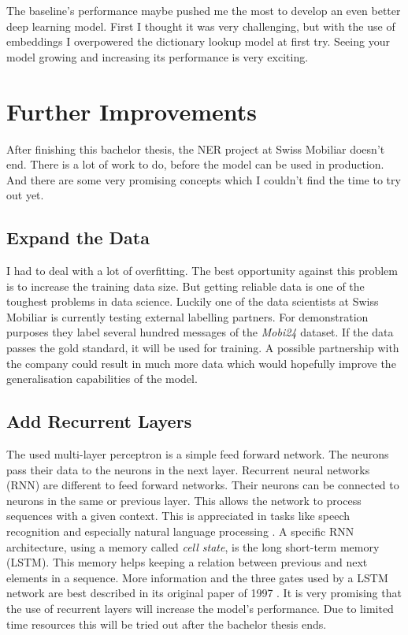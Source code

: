 The baseline's performance maybe pushed me the most to develop an even better deep learning model. First I thought it was very challenging, but with the use of embeddings I overpowered the dictionary lookup model at first try. Seeing your model growing and increasing its performance is very exciting.

\section{Further Improvements}

After finishing this bachelor thesis, the NER project at Swiss Mobiliar doesn't end. There is a lot of work to do, before the model can be used in production. And there are some very promising concepts which I couldn't find the time to try out yet.

\subsection{Expand the Data}

I had to deal with a lot of overfitting. The best opportunity against this problem is to increase the training data size. But getting reliable data is one of the toughest problems in data science. Luckily one of the data scientists at Swiss Mobiliar is currently testing external labelling partners. For demonstration purposes they label several hundred messages of the \emph{Mobi24} dataset. If the data passes the gold standard, it will be used for training. A possible partnership with the company could result in much more data which would hopefully improve the generalisation capabilities of the model.

\subsection{Add Recurrent Layers}

The used multi-layer perceptron is a simple feed forward network. The neurons pass their data to the neurons in the next layer. Recurrent neural networks (RNN) are different to feed forward networks. Their neurons can be connected to neurons in the same or previous layer. This allows the network to process sequences with a given context. This is appreciated in tasks like speech recognition and especially natural language processing \cite{wiki07}. A specific RNN architecture, using a memory called \emph{cell state}, is the long short-term memory (LSTM). This memory helps keeping a relation between previous and next elements in a sequence. More information and the three gates used by a LSTM network are best described in its original paper of 1997 \cite{lstm97}. It is very promising that the use of recurrent layers will increase the model's performance. Due to limited time resources this will be tried out after the bachelor thesis ends.

